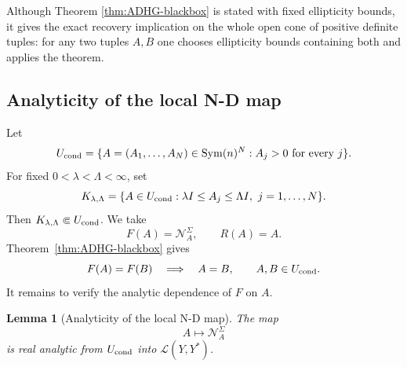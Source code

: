 \documentclass[12pt,oneside]{amsart}
\newtheorem{lemma}[theorem]{Lemma}
\newcommand{\cL}{\mathcal L}
\newcommand{\cN}{\mathcal N}
\newcommand{\Sym}{\operatorname{Sym}}
\begin{document}
Although Theorem \ref{thm:ADHG-blackbox} is stated with fixed ellipticity bounds, it gives the exact recovery implication on the whole open cone of positive definite tuples: for any two tuples $A,B$ one chooses ellipticity bounds containing both and applies the theorem.

\subsection{Analyticity of the local N-D map}\label{subsec:cond-reduction}

Let
\[
        U_{\rm cond}
        =\{A=(A_1,\ldots,A_N)\in\Sym(n)^N:
        A_j>0\text{ for every }j\}.
\]
For fixed \(0<\lambda<\Lambda<\infty\), set
\[
        K_{\lambda,\Lambda}
        =\{A\in U_{\rm cond}:\lambda I\le A_j\le\Lambda I,
        \ j=1,\ldots,N\}.
\]
Then \(K_{\lambda,\Lambda}\Subset U_{\rm cond}\).  We take
\[
        F(A)=\cN_A^\Sigma,
        \qquad
        R(A)=A .
\]
Theorem~\ref{thm:ADHG-blackbox} gives
\[
        F(A)=F(B)\quad\Longrightarrow\quad A=B,
        \qquad A,B\in U_{\rm cond}.
\]
It remains to verify the analytic dependence of \(F\) on \(A\).

\begin{lemma}[Analyticity of the local N-D map]\label{lem:cond-analytic}
The map
\[
        A\mapsto \cN_A^\Sigma
\]
is real analytic from \(U_{\rm cond}\) into \(\cL(Y,Y^*)\).
\end{lemma}
\end{document}
